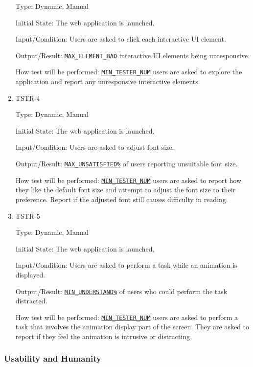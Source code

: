 \documentclass[12pt, titlepage]{article}
\begin{document}
\begin{enumerate}
Type: Dynamic, Manual
					
Initial State: The web application is launched.
					
Input/Condition: Users are asked to click each interactive UI element.
					
Output/Result: \hyperref[MAX_ELEMENT_BAD]{\texttt{MAX\_ELEMENT\_BAD}} interactive UI elements being unresponsive.
					
How test will be performed: \hyperref[MIN_TESTER_NUM]{\texttt{MIN\_TESTER\_NUM}} users are asked to explore the application and report any unresponsive interactive elements.

\item{TSTR-4\\}\label{TSTR-4}

Type: Dynamic, Manual
					
Initial State: The web application is launched.
					
Input/Condition: Users are asked to adjust font size.
					
Output/Result: \hyperref[MAX_UNSATISFIED]{\texttt{MAX\_UNSATISFIED\%}} of users reporting unsuitable font size.
					
How test will be performed: \hyperref[MIN_TESTER_NUM]{\texttt{MIN\_TESTER\_NUM}} users are asked to report how they like the default font size and attempt to adjust the font size to their preference. Report if the adjusted font still causes difficulty in reading.

\item{TSTR-5\\}\label{TSTR-5}

Type: Dynamic, Manual
					
Initial State: The web application is launched.
					
Input/Condition: Users are asked to perform a task while an animation is displayed.
					
Output/Result: \hyperref[MIN_UNDERSTAND]{\texttt{MIN\_UNDERSTAND\%}} of users who could perform the task distracted.
					
How test will be performed: \hyperref[MIN_TESTER_NUM]{\texttt{MIN\_TESTER\_NUM}} users are asked to perform a task that involves the animation display part of the screen.  They are asked to report if they feel the animation is intrusive or distracting.
\end{enumerate}

\subsubsection{Usability and Humanity}
\end{document}
